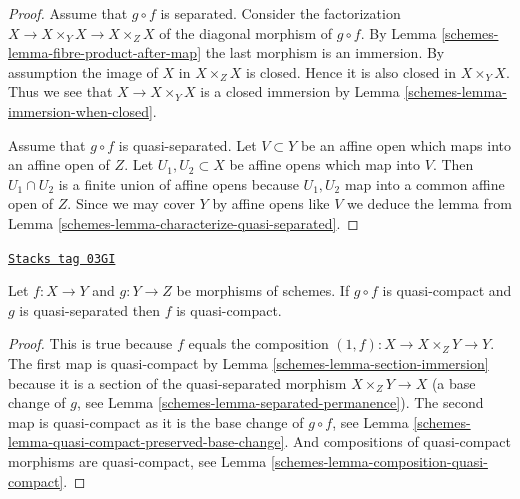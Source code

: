 \begin{proof}

Assume that $g \circ f$ is separated.
Consider the factorization $X \to X \times_Y X \to X \times_Z X$
of the diagonal morphism of $g \circ f$.
By Lemma \ref{schemes-lemma-fibre-product-after-map}
the last morphism is an immersion. By assumption the image
of $X$ in $X \times_Z X$ is closed. Hence it is also closed
in $X \times_Y X$. Thus we see that $X \to X \times_Y X$
is a closed immersion by Lemma \ref{schemes-lemma-immersion-when-closed}.

\medskip\noindent
Assume that $g \circ f$ is quasi-separated.
Let $V \subset Y$ be an affine open which maps into an affine
open of $Z$. Let $U_1, U_2 \subset X$ be affine opens which
map into $V$. Then $U_1 \cap U_2$ is a finite union of affine
opens because $U_1, U_2$ map into a common affine open
of $Z$. Since we may cover $Y$ by affine opens like $V$ we
deduce the lemma from Lemma \ref{schemes-lemma-characterize-quasi-separated}.
\end{proof}

\begin{lemma}
\label{schemes-lemma-quasi-compact-permanence}
\href{https://stacks.math.columbia.edu/tag/03GI}{\texttt{Stacks tag 03GI}}

Let $f : X \to Y$ and $g : Y \to Z$ be morphisms of schemes.
If $g \circ f$ is quasi-compact and $g$ is quasi-separated
then $f$ is quasi-compact.
\end{lemma}

\begin{proof}

This is true because $f$ equals the composition
$(1, f) : X \to X \times_Z Y \to Y$. The first map
is quasi-compact by Lemma \ref{schemes-lemma-section-immersion}
because it is a section of the quasi-separated morphism $X \times_Z Y \to X$
(a base change of $g$, see Lemma \ref{schemes-lemma-separated-permanence}).
The second map is quasi-compact as it
is the base change of $g \circ f$, see
Lemma \ref{schemes-lemma-quasi-compact-preserved-base-change}.
And compositions of quasi-compact
morphisms are quasi-compact, see Lemma \ref{schemes-lemma-composition-quasi-compact}.
\end{proof}

